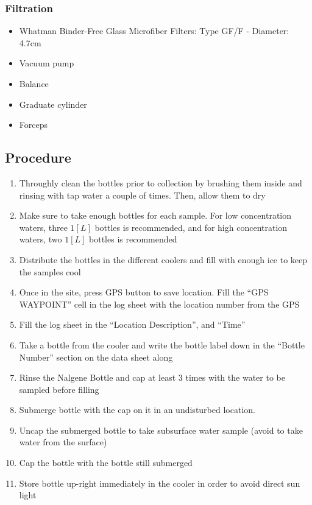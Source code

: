 \begin{appendices}
\subsubsection*{Filtration}
\begin{itemize}[itemsep=2pt,parsep=2pt]
  \item Whatman Binder-Free Glass Microfiber Filters: Type GF/F - Diameter: 4.7cm
  \item Vacuum pump
  \item Balance
  \item Graduate cylinder
  \item Forceps
\end{itemize}

\subsection{Procedure}
\begin{enumerate}[itemsep=2pt,parsep=2pt]
  \item Throughly clean the bottles prior to collection by brushing them inside and rinsing with tap water a couple of times. Then, allow them to dry
  \item Make sure to take enough bottles for each sample. For low concentration waters, three $1[L]$ bottles is recommended, and for high concentration waters, two $1[L]$ bottles is recommended
  \item Distribute the bottles in the different coolers and fill with enough ice to keep the samples cool
  \item Once in the site, press GPS button to save location. Fill the ``GPS WAYPOINT'' cell in the log sheet with the location number from the GPS
  \item Fill the log sheet in the ``Location Description'', and ``Time''
  \item Take a bottle from the cooler and write the bottle label down in the ``Bottle Number'' section on the data sheet along
  \item Rinse the Nalgene Bottle and cap at least 3 times with the water to be sampled before filling
  \item Submerge bottle with the cap on it in an undisturbed location.
  \item Uncap the submerged bottle  to take subsurface water sample (avoid to take water from the surface) \cite{Montana08} 
  \item Cap the bottle with the bottle still submerged
  \item Store bottle up-right immediately in the cooler in order to avoid direct sun light \cite{Mueller1995}

\end{enumerate}
\end{appendices}
